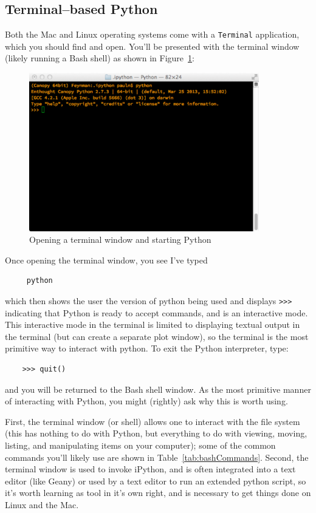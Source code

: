 \subsection{Terminal--based Python}
\label{sec:terminalPython}

Both the Mac and Linux operating systems come with a \texttt{Terminal} application, which you should find and open. You'll be presented with the terminal window (likely running a Bash shell) as shown in Figure~\ref{fig:startingPython}:
\begin{figure}[h]
	\centering
	\includegraphics[width=10cm]{Figures/BasicPython/TerminalWindow2.pdf}
	\caption{Opening a terminal window and starting Python}
	\label{fig:startingPython}       %
\end{figure}
Once opening the terminal window, you see I've typed 
\small\begin{verbatim}
	 python
\end{verbatim}\normalsize
which then shows the user the version of python being used and displays \verb!>>>! indicating that Python is ready to accept commands, and is an interactive mode. This interactive mode in the terminal is limited to displaying textual output in the terminal (but can create a separate plot window), so the terminal is the most primitive way to interact with python. To exit the Python interpreter, type:
\small\begin{verbatim}
	>>> quit()
\end{verbatim}\normalsize
and you will be returned to the Bash shell window. As the most primitive manner of interacting with Python, you might (rightly) ask why this is worth using.

First, the terminal window (or shell) allows one to interact with the file system (this has nothing to do with Python, but everything to do with viewing, moving, listing, and manipulating items on your computer); some of the common commands you'll likely use are shown in Table~\ref{tab:bashCommands}. Second, the terminal window is used to invoke iPython, and is often integrated into a text editor (like Geany) or used by a text editor to run an extended python script, so it's worth learning as tool in it's own right, and is necessary to get things done on Linux and the Mac. 

